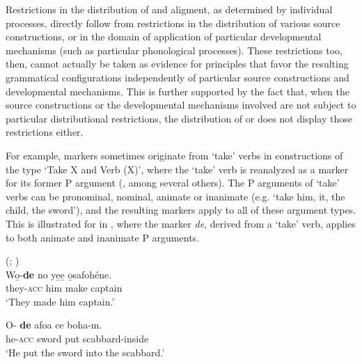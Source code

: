 \documentclass[output=paper]{langsci/langscibook}
\begin{document}
Restrictions in the distribution of  and  aligment,
as determined by individual processes, directly follow from  restrictions in the distribution of
various source constructions, or in the domain of application of particular developmental mechanisms (such as particular phonological processes). These restrictions too, then, cannot actually
be taken as evidence  for principles that favor the resulting
grammatical configurations independently of particular source
constructions and developmental mechanisms. This is further
supported by the fact that, when the source constructions or the
developmental mechanisms involved are not subject to particular
distributional restrictions, the distribution of  or
  does not display those restrictions either.

For example, 
markers sometimes originate from `take' verbs in constructions of the type `Take
X and Verb (X)', where the `take' verb is reanalyzed as a marker
for its former
       P argument (\citealt{Lord1993,Chappell2013}, among
         several others). The P arguments of `take' verbs can be pronominal, nominal, animate or inanimate (e.g. `take him, it, the child, the sword'), 
and the resulting  markers apply to all of these
argument types. This is illustrated for  
in 
 ,
where the  marker {\em de},
         derived from a `take' verb, applies to both animate and inanimate P arguments.



\ea\label{twi}
 (; )\\
\ea
\gll Wo̱-\textbf{{de}} no ye̱e̱ o̱safohéne.\\
they-\textsc{acc} him make captain\\
\glt `They made him captain.' 

\ex
\gll O-\textbf{{ de}} afoa ce boha-m.\\
he-\textsc{acc} sword put scabbard-inside\\
\glt `He put the sword into the scabbard.' 

\z
\z
\end{document}
